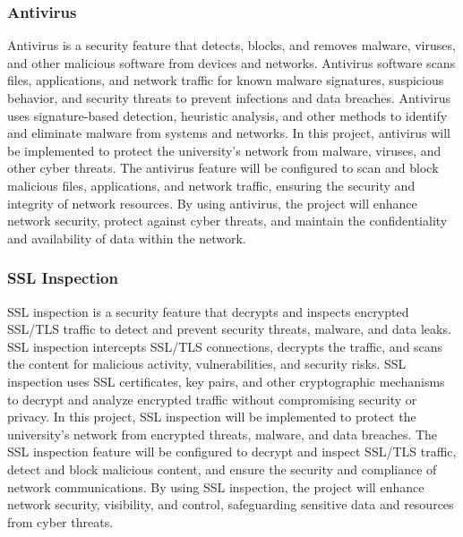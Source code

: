 \documentclass[12pt]{report}
\begin{document}
\subsubsection{Antivirus}
Antivirus is a security feature that detects, blocks, and removes malware, viruses, and other malicious software from devices and networks. Antivirus software scans files, applications, and network traffic for known malware signatures, suspicious behavior, and security threats to prevent infections and data breaches. Antivirus uses signature-based detection, heuristic analysis, and other methods to identify and eliminate malware from systems and networks. In this project, antivirus will be implemented to protect the university's network from malware, viruses, and other cyber threats. The antivirus feature will be configured to scan and block malicious files, applications, and network traffic, ensuring the security and integrity of network resources. By using antivirus, the project will enhance network security, protect against cyber threats, and maintain the confidentiality and availability of data within the network. \cite{antivirus}
\subsubsection{SSL Inspection}
SSL inspection is a security feature that decrypts and inspects encrypted SSL/TLS traffic to detect and prevent security threats, malware, and data leaks. SSL inspection intercepts SSL/TLS connections, decrypts the traffic, and scans the content for malicious activity, vulnerabilities, and security risks. SSL inspection uses SSL certificates, key pairs, and other cryptographic mechanisms to decrypt and analyze encrypted traffic without compromising security or privacy. In this project, SSL inspection will be implemented to protect the university's network from encrypted threats, malware, and data breaches. The SSL inspection feature will be configured to decrypt and inspect SSL/TLS traffic, detect and block malicious content, and ensure the security and compliance of network communications. By using SSL inspection, the project will enhance network security, visibility, and control, safeguarding sensitive data and resources from cyber threats. \cite{SSLinspection}
\end{document}
